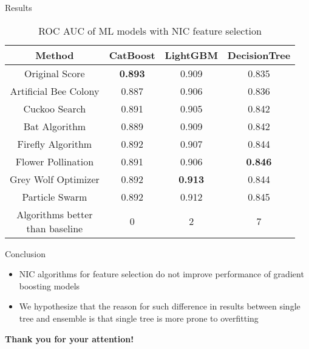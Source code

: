 \documentclass[aspectratio=169,xcolor=dvipsnames]{beamer}
\begin{document}
\begin{frame}{Results}
	\begin{table}
		\centering
		\caption{ROC AUC of ML models with NIC feature selection}
		\label{tab:results}
		\begin{tabular}{c c c c}
			\hline
			Method                & CatBoost       & LightGBM       & DecisionTree   \\
			\hline
			Original Score        & \textbf{0.893} & 0.909          & 0.835          \\
			Artificial Bee Colony & 0.887          & 0.906          & 0.836          \\
			Cuckoo Search         & 0.891          & 0.905          & 0.842          \\
			Bat Algorithm         & 0.889          & 0.909          & 0.842          \\
			Firefly Algorithm     & 0.892          & 0.907          & 0.844          \\
			Flower Pollination    & 0.891          & 0.906          & \textbf{0.846} \\
			Grey Wolf Optimizer   & 0.892          & \textbf{0.913} & 0.844          \\
			Particle Swarm        & 0.892          & 0.912          & 0.845          \\
			\hline
			\makecell{Algorithms better                                              \\
			than baseline}        & 0              & 2              & 7              \\
			\hline
		\end{tabular}
	\end{table}
\end{frame}


\begin{frame}{Conclusion}
	\begin{itemize}
		\item NIC algorithms for feature selection do not improve
		      performance of gradient boosting models
		\item We hypothesize that the reason for such difference
		      in results between single tree and ensemble is that
		      single tree is more prone to overfitting
	\end{itemize}
\end{frame}


\begin{frame}
	\Huge{\centerline{\textbf{Thank you for your attention!}}}
\end{frame}

\end{document}
